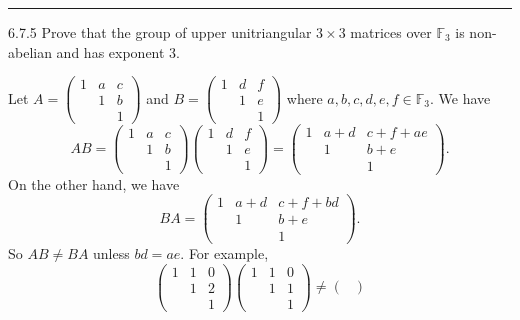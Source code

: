 \documentclass[a4paper, 12pt]{article}
\begin{document}
\noindent\rule{7in}{2.8pt}
\begin{problem}{6.7.5}
Prove that the group of upper unitriangular \(3\times 3\) matrices over \(\mathbb{F}_3\) is non-abelian and has exponent 3.
\end{problem}
\begin{solution}
Let \(A=\begin{pmatrix}
    1 &a&c\\ 
    & 1&b \\ 
  & & 1
\end{pmatrix}\) and \(B=\begin{pmatrix}
    1&d&f\\ 
    &1&e\\ 
    &&1
\end{pmatrix}\) where \(a,b,c,d,e,f\in \mathbb{F}_3\). We have 
\[AB=\begin{pmatrix}
    1&a&c\\ 
    &1&b\\ 
    &&1
\end{pmatrix}\begin{pmatrix}
    1&d&f\\ 
    &1&e\\ 
    &&1
\end{pmatrix}=\begin{pmatrix}
    1&a+d&c+f+ae\\ 
    &1&b+e\\ 
    &&1
\end{pmatrix}.\]
On the other hand, we have 
\[BA=\begin{pmatrix}
    1&a+d&c+f+bd\\ 
    &1&b+e\\ 
    &&1
\end{pmatrix}.\]
So \(AB\neq BA\) unless \(bd=ae\). For example, 
\[\begin{pmatrix}
    1&1&0\\ 
    &1&2\\ 
    &&1
\end{pmatrix}\begin{pmatrix}
    1&1&0\\ 
    &1&1\\ 
    &&1
\end{pmatrix}\neq \begin{pmatrix}

\end{pmatrix}\]
\end{solution}
\end{document}
